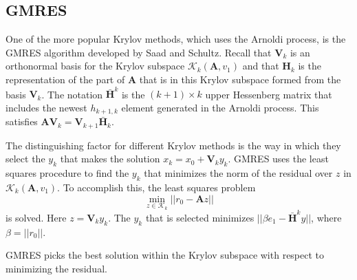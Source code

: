 \documentclass[12pt]{article}
\newcommand{\ve}[1]{\ensuremath{\mathbf{#1}}}
\begin{document}
%

\subsection*{GMRES}
One of the more popular Krylov methods, which uses the Arnoldi process, is the GMRES algorithm developed by Saad and Schultz. %
Recall that $\ve{V}_{k}$ is an orthonormal basis for the Krylov subspace $\mathcal{K}_{k}(\ve{A}, v_1)$ and that $\ve{H}_{k}$ is the representation of the part of $\ve{A}$ that is in this Krylov subspace formed from the basis $\ve{V}_{k}$. The notation $\bar{\ve{H}}^{k}$ is the $(k+1) \times k$ upper Hessenberg matrix that includes the newest $h_{k+1,k}$ element generated in the Arnoldi process. This satisfies $\ve{AV}_{k} = \ve{V}_{k+1}\bar{\ve{H}}_{k}$.%

The distinguishing factor for different Krylov methods is the way in which they select the $y_k$ that makes the solution $x_k = x_0 + \ve{V}_k y_k$. GMRES uses the least squares procedure to find the $y_k$ that minimizes the norm of the residual over $z$ in $\mathcal{K}_{k}(\ve{A}, v_1)$. To accomplish this, the least squares problem
%
\begin{equation}
  \min_{z \in \mathcal{K}_{k}} ||r_{0} - \ve{A}z||
  \label{eq:least-squares}
\end{equation} 
%
is solved. Here $z = \ve{V}_k y_k$. The $y_{k}$ that is selected minimizes $||\beta e_{1} - \bar{\ve{H}}^{k} y||$, where $\beta = ||r_{0}||$.%

GMRES picks the best solution within the Krylov subspace with respect to minimizing the residual. %
\end{document}
